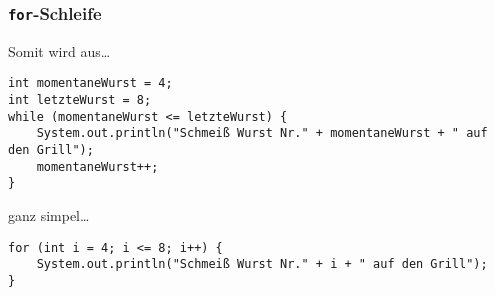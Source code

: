 \documentclass{../../presentation}
\begin{document}
\begin{frame}[fragile]
  \frametitle{\texttt{for}-Schleife}
  Somit wird aus\dots

  \begin{verbatim}
int momentaneWurst = 4;
int letzteWurst = 8;
while (momentaneWurst <= letzteWurst) {
    System.out.println("Schmeiß Wurst Nr." + momentaneWurst + " auf den Grill");
    momentaneWurst++;
}
  \end{verbatim}
  ganz simpel\dots
  \begin{verbatim}
for (int i = 4; i <= 8; i++) {
    System.out.println("Schmeiß Wurst Nr." + i + " auf den Grill");
}
  \end{verbatim}

\end{frame}
\end{document}
